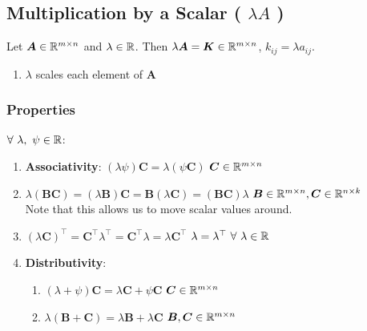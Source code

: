 \subsection{Multiplication by a Scalar ( $\lambda A$ )}

Let $\bm{A} \in \mathbb{R}^{m\times n}$ and $\lambda \in \mathbb{R}$.
Then $\lambda \bm{A} = \bm{K} \in \mathbb{R}^{m\times n}$, $k_{ij} = \lambda a_{ij}$.
\hfill \cite{mfml/book/mml/Deisenroth-Faisal-Ong}


\begin{enumerate}
    \item $\lambda$ scales each element of $\bm{A}$
    \hfill \cite{mfml/book/mml/Deisenroth-Faisal-Ong}
\end{enumerate}





\subsubsection{Properties}

$\forall\ \lambda,\ \psi \in \mathbb{R}$:
\vspace{0.2cm}
\begin{enumerate}
    \item \textbf{Associativity}:
    $(\lambda \psi )\bm{C} = \lambda (\psi \bm{C})$ \hfill $\bm{C} \in  \mathbb{R}^{m\times n}$
    \hfill \cite{mfml/book/mml/Deisenroth-Faisal-Ong}

    \item $
        \lambda (\bm{BC})
        = (\lambda \bm{B})\bm{C}
        = \bm{B}(\lambda \bm{C})
        = (\bm{BC})\lambda
        $
    \hfill $\bm{B} \in  \mathbb{R}^{m\times n}, \bm{C} \in  \mathbb{R}^{n\times k}$
    \hfill \cite{mfml/book/mml/Deisenroth-Faisal-Ong}
    \\
    Note that this allows us to move scalar values around.
    \hfill \cite{mfml/book/mml/Deisenroth-Faisal-Ong}

    \item $
        (\lambda \bm{C}) ^\top
        = \bm{C}^\top \lambda ^\top
        = \bm{C}^\top \lambda
        = \lambda \bm{C}^\top
    $
    \hfill $\lambda  = \lambda ^\top \  \forall \ \lambda  \in  \mbbR$
    \hfill \cite{mfml/book/mml/Deisenroth-Faisal-Ong}

    \item \textbf{Distributivity}:
    \begin{enumerate}
        \item $(\lambda  + \psi )\bm{C} = \lambda \bm{C} + \psi \bm{C}$
        \hfill $\bm{C} \in  \mathbb{R}^{m\times n}$
        \hfill \cite{mfml/book/mml/Deisenroth-Faisal-Ong}

        \item $\lambda (\bm{B} + \bm{C}) = \lambda \bm{B} + \lambda \bm{C}$
        \hfill $\bm{B}, \bm{C} \in  \mathbb{R}^{m\times n}$
        \hfill \cite{mfml/book/mml/Deisenroth-Faisal-Ong}
    \end{enumerate}
\end{enumerate}



